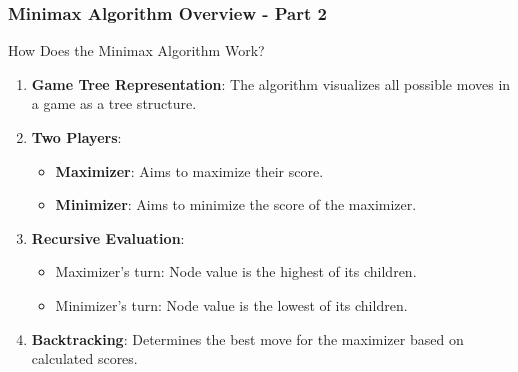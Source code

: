 \documentclass[aspectratio=169]{beamer}
\begin{document}
\begin{frame}[fragile]
    \frametitle{Minimax Algorithm Overview - Part 2}
    \begin{block}{How Does the Minimax Algorithm Work?}
        \begin{enumerate}
            \item \textbf{Game Tree Representation}: The algorithm visualizes all possible moves in a game as a tree structure.
            \item \textbf{Two Players}:
                \begin{itemize}
                    \item \textbf{Maximizer}: Aims to maximize their score.
                    \item \textbf{Minimizer}: Aims to minimize the score of the maximizer.
                \end{itemize}
            \item \textbf{Recursive Evaluation}:
                \begin{itemize}
                    \item Maximizer's turn: Node value is the highest of its children.
                    \item Minimizer's turn: Node value is the lowest of its children.
                \end{itemize}
            \item \textbf{Backtracking}: Determines the best move for the maximizer based on calculated scores.
        \end{enumerate}
    \end{block}
\end{frame}
\end{document}
